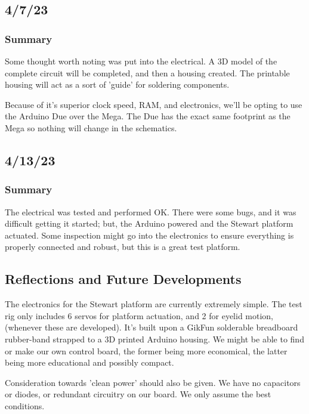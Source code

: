 \documentclass[a4paper, 10pt]{article}
\begin{document}
	\subsection{4/7/23}
		\subsubsection{Summary}
		Some thought worth noting was put into the electrical. A 3D model of the complete circuit will be completed, and then a housing created. The printable housing will act as a sort of 'guide' for soldering components. 
		
		Because of it's superior clock speed, RAM, and electronics, we'll be opting to use the Arduino Due over the Mega. The Due has the exact same footprint as the Mega so nothing will change in the schematics.
		
	\subsection{4/13/23}
		\subsubsection{Summary}
		The electrical was tested and performed OK. There were some bugs, and it was difficult getting it started; but, the Arduino powered and the Stewart platform actuated. Some inspection might go into the electronics to ensure everything is properly connected and robust, but this is a great test platform.
		
	\subsection{Reflections and Future Developments}
	The electronics for the Stewart platform are currently extremely simple. The test rig only includes 6 servos for platform actuation, and 2 for eyelid motion, (whenever these are developed). It's built upon a GikFun solderable breadboard rubber-band strapped to a 3D printed Arduino housing. We might be able to find or make our own control board, the former being more economical, the latter being more educational and possibly compact. 
	
	Consideration towards 'clean power' should also be given. We have no capacitors or diodes, or redundant circuitry on our board. We only assume the best conditions. 
\end{document}

